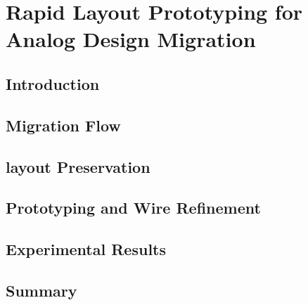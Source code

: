 
\chapter{Rapid Layout Prototyping for Analog Design Migration}\label{chap:RLPADM}
  \section{Introduction}\label{sec:RLPADMIntro}
  \section{Migration Flow}\label{sec:MigrateFlow}
  \section{layout Preservation}\label{sec:LayoutPreserv}
  \section{Prototyping and Wire Refinement}\label{sec:PWR}
  \section{Experimental Results}\label{sec:RLPADMExp}
  \section{Summary}\label{sec:RLPADMSum}